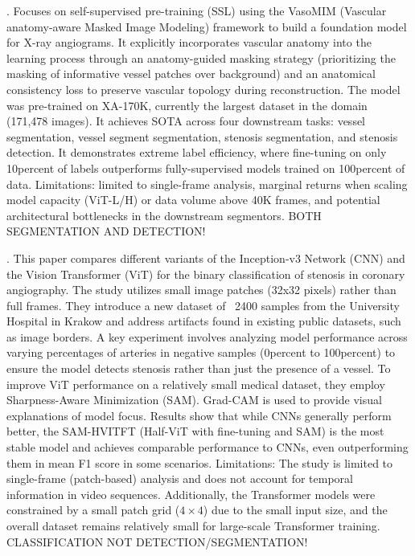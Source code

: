 \documentclass{article}
\begin{document}
\cite{huang2026vasomim}. Focuses on self-supervised pre-training (SSL) using the VasoMIM (Vascular anatomy-aware Masked Image Modeling) framework to build a foundation model for X-ray angiograms. It explicitly incorporates vascular anatomy into the learning process through an anatomy-guided masking strategy (prioritizing the masking of informative vessel patches over background) and an anatomical consistency loss to preserve vascular topology during reconstruction. The model was pre-trained on XA-170K, currently the largest dataset in the domain (171,478 images). It achieves SOTA across four downstream tasks: vessel segmentation, vessel segment segmentation, stenosis segmentation, and stenosis detection. It demonstrates extreme label efficiency, where fine-tuning on only 10percent of labels outperforms fully-supervised models trained on 100percent of data. Limitations: limited to single-frame analysis, marginal returns when scaling model capacity (ViT-L/H) or data volume above 40K frames, and potential architectural bottlenecks in the downstream segmentors. BOTH SEGMENTATION AND DETECTION!

\cite{JUNGIEWICZ2023120234}. This paper compares different variants of the Inception-v3 Network (CNN) and the Vision Transformer (ViT) for the binary classification of stenosis in coronary angiography. The study utilizes small image patches (32x32 pixels) rather than full frames. They introduce a new dataset of ~2400 samples from the University Hospital in Krakow and address artifacts found in existing public datasets, such as image borders. A key experiment involves analyzing model performance across varying percentages of arteries in negative samples (0percent to 100percent) to ensure the model detects stenosis rather than just the presence of a vessel. To improve ViT performance on a relatively small medical dataset, they employ Sharpness-Aware Minimization (SAM). Grad-CAM is used to provide visual explanations of model focus. Results show that while CNNs generally perform better, the SAM-HVITFT (Half-ViT with fine-tuning and SAM) is the most stable model and achieves comparable performance to CNNs, even outperforming them in mean F1 score in some scenarios. Limitations: The study is limited to single-frame (patch-based) analysis and does not account for temporal information in video sequences. Additionally, the Transformer models were constrained by a small patch grid ($4\times4$) due to the small input size, and the overall dataset remains relatively small for large-scale Transformer training. CLASSIFICATION NOT DETECTION/SEGMENTATION!
\end{document}
